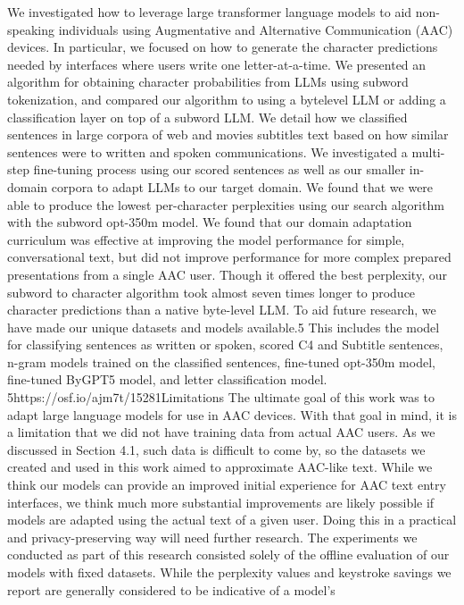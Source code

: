 We investigated how to leverage large transformer
language models to aid non-speaking individuals
using Augmentative and Alternative Communication (AAC) devices. In particular, we focused on
how to generate the character predictions needed
by interfaces where users write one letter-at-a-time.
We presented an algorithm for obtaining character
probabilities from LLMs using subword tokenization, and compared our algorithm to using a bytelevel LLM or adding a classification layer on top of
a subword LLM. We detail how we classified sentences in large corpora of web and movies subtitles
text based on how similar sentences were to written and spoken communications. We investigated
a multi-step fine-tuning process using our scored
sentences as well as our smaller in-domain corpora
to adapt LLMs to our target domain.
We found that we were able to produce the lowest per-character perplexities using our search algorithm with the subword opt-350m model. We
found that our domain adaptation curriculum was
effective at improving the model performance for
simple, conversational text, but did not improve
performance for more complex prepared presentations from a single AAC user. Though it offered
the best perplexity, our subword to character algorithm took almost seven times longer to produce
character predictions than a native byte-level LLM.
To aid future research, we have made our unique
datasets and models available.5 This includes the
model for classifying sentences as written or spoken, scored C4 and Subtitle sentences, n-gram models trained on the classified sentences, fine-tuned
opt-350m model, fine-tuned ByGPT5 model, and
letter classification model.
5https://osf.io/ajm7t/15281Limitations
The ultimate goal of this work was to adapt large
language models for use in AAC devices. With that
goal in mind, it is a limitation that we did not have
training data from actual AAC users. As we discussed in Section 4.1, such data is difficult to come
by, so the datasets we created and used in this work
aimed to approximate AAC-like text. While we
think our models can provide an improved initial
experience for AAC text entry interfaces, we think
much more substantial improvements are likely
possible if models are adapted using the actual
text of a given user. Doing this in a practical and
privacy-preserving way will need further research.
The experiments we conducted as part of this
research consisted solely of the offline evaluation
of our models with fixed datasets. While the perplexity values and keystroke savings we report are
generally considered to be indicative of a model’s
